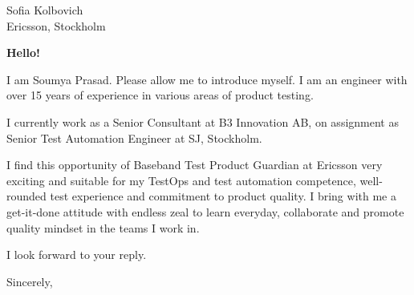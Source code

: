 \documentclass[10pt]{letter} %
\begin{document}

\begin{letter}{Sofia Kolbovich \\ Ericsson, Stockholm} %


\opening{\textbf{Hello!}}
I am Soumya Prasad. Please allow me to introduce myself.  
I am an engineer with over 15 years of experience in various
areas of product testing.

\hfill \break
I currently work as a Senior Consultant at B3 Innovation AB, on assignment as Senior Test Automation Engineer at SJ, Stockholm.

\hfill \break
I find this opportunity of Baseband Test Product Guardian at Ericsson very exciting and suitable for my TestOps and test automation competence, well-rounded test experience and commitment to product quality. I bring with me a get-it-done attitude with endless zeal to learn everyday, collaborate and promote quality mindset in the teams I work in.

I look forward to your reply.

\vspace{2\parskip} %
\closing{Sincerely,}
\vspace{2\parskip} %




\end{letter}
 
\end{document}
